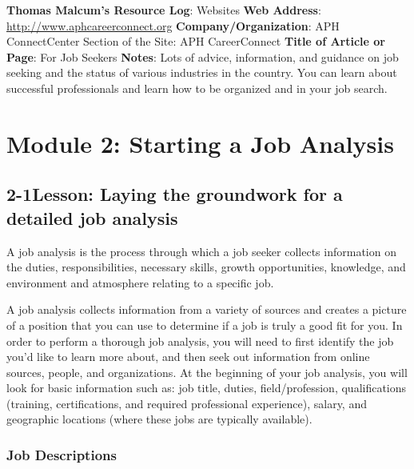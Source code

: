 \textbf{Thomas Malcum's Resource Log}: Websites
\break \textbf{Web Address}: \href{http://www.aphcareerconnect.org}{http://www.aphcareerconnect.org} 
\break \textbf{Company/Organization}: APH ConnectCenter Section of the Site: APH CareerConnect
\break \textbf{Title of Article or Page}: For Job Seekers
\break \textbf{Notes}: Lots of advice, information, and guidance on job seeking and the status of various industries in the country. You can learn about successful professionals and learn how to be organized and in your job search.
 
 
\pagebreak \section*{Module 2:	Starting a Job Analysis}
\noindent\makebox[\textwidth]{\rule{\linewidth}{0.4pt}} 
\localtableofcontents 
\noindent\makebox[\textwidth]{\rule{\linewidth}{0.4pt}} 


\pagebreak \subsection*{2-1\quad Lesson: Laying the groundwork for a detailed job analysis}
A job analysis is the process through which a job seeker collects information on the duties, responsibilities, necessary skills, growth opportunities, knowledge, and environment and atmosphere relating to a specific job.

A job analysis collects information from a variety of sources and creates a picture of a position that you can use to determine if a job is truly a good fit for you. In order to perform a thorough job analysis, you will need to first identify the job you'd like to learn more about, and then seek out information from online sources, people, and organizations.
At the beginning of your job analysis, you will look for basic information such as: job title, duties, field/profession, qualifications (training, certifications, and required professional experience), salary, and geographic locations (where these jobs are typically available).
\subsubsection*{Job Descriptions}


